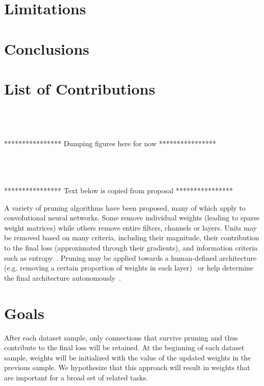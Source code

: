 \documentclass{article}
\begin{document}
\section{Limitations}


\section{Conclusions}


\section{List of Contributions}


\ \\ 
\ \\
\ \\
**************** Dumping figures here for now ****************





\ \\ 
\ \\
\ \\

**************** Text below is copied from proposal ****************

A variety of pruning algorithms have been proposed, many of which apply to convolutional neural networks. Some remove individual weights (leading to sparse weight matrices) while others remove entire filters, channels or layers. Units may be removed based on many criteria, including their magnitude, their contribution to the final loss (approximated through their gradients), and information criteria such as entropy~\citet{NIPS_learning_weights_pruning, prune_transfer_learning, prune_entropy, prune_slimming}.  Pruning may be applied towards a human-defined architecture (e.g. removing a certain proportion of weights in each layer)~\citet{prune_nisp} or help determine the final architecture autonomously~\citet{prune_thinet}. 

\section{Goals}





After each dataset sample, only connections that survive pruning and thus contribute to the final loss will be retained.  At the beginning of each dataset sample, weights will be initialized with the value of the updated weights in the previous sample. We hypothesize that this approach will result in weights that are important for a broad set of related tasks. 
\end{document}
